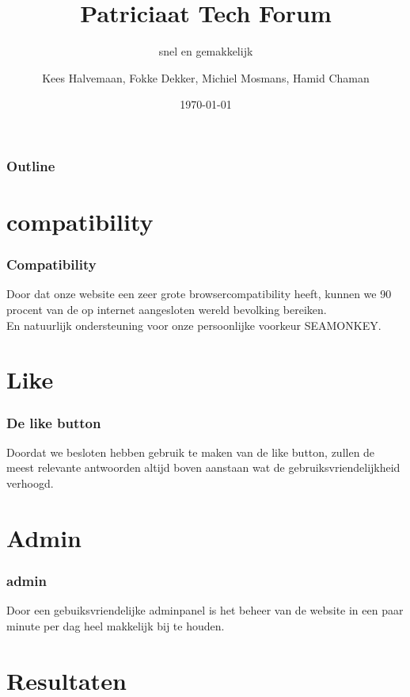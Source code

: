 \documentclass{beamer}
\title{Patriciaat Tech Forum}
\subtitle{snel en gemakkelijk}
\author{Kees Halvemaan, Fokke Dekker, Michiel Mosmans, Hamid Chaman}
\institute
{
Project webprogrammeren en databases \\
 Faculteit der Natuurwetenschappen, Wiskunde en Informatica \\
 Universiteit van Amsterdam\\
}
\date{\today}
\begin{document}
\begin{frame}
  \titlepage
\end{frame}

\begin{frame}
\frametitle{Outline}
\tableofcontents
\end{frame}


\section{compatibility}

\begin{frame}
\frametitle{Compatibility}
Door dat onze website een zeer grote browsercompatibility heeft, kunnen we 90 procent van de op internet aangesloten wereld bevolking bereiken. \\ En natuurlijk ondersteuning voor onze persoonlijke voorkeur SEAMONKEY.


\end{frame}

 \section{Like}

 \begin{frame}
\frametitle{De like button}

Doordat we besloten hebben gebruik te maken van de like button, zullen de meest relevante antwoorden altijd boven aanstaan wat de gebruiksvriendelijkheid verhoogd.

\end{frame}

\section{Admin}

\begin{frame}
\frametitle{admin}

Door een gebuiksvriendelijke adminpanel is het beheer van de website in een paar minute per dag heel makkelijk bij te houden. 
\end{frame}

\section{Resultaten}
\end{document}
